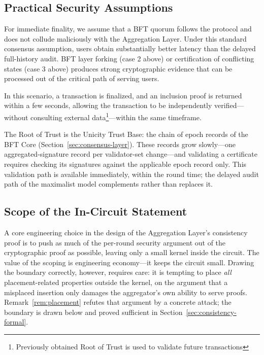 \documentclass[twocolumn]{article}
\begin{document}
\subsection{Practical Security Assumptions}
\label{sec:practical}

For immediate finality, we assume that a BFT quorum follows the protocol and does not collude maliciously with the Aggregation Layer. Under this standard consensus assumption, users obtain substantially better latency than the delayed full-history audit. BFT layer forking (case 2 above) or certification of conflicting states (case 3 above) produces strong cryptographic evidence that can be processed out of the critical path of serving users.

In this scenario, a transaction is finalized, and an inclusion proof is returned within a few seconds, allowing the transaction to be independently verified—without consulting external data\footnote{Previously obtained Root of Trust is used to validate future transactions}—within the same timeframe.

The Root of Trust is the Unicity Trust Base: the chain of epoch records of the BFT Core (Section~\ref{sec:consensus-layer}). These records grow slowly---one aggregated-signature record per validator-set change---and validating a certificate requires checking its signatures against the applicable epoch record only. This validation path is available immediately, within the round time; the delayed audit path of the maximalist model complements rather than replaces it.


\subsection{Scope of the In-Circuit Statement}
\label{sec:scope}

A core engineering choice in the design of the Aggregation Layer's consistency proof is to push as much of the per-round security argument out of the cryptographic proof as possible, leaving only a small kernel inside the circuit. The value of the scoping is engineering economy---it keeps the circuit small. Drawing the boundary correctly, however, requires care: it is tempting to place \emph{all} placement-related properties outside the kernel, on the argument that a misplaced insertion only damages the aggregator's own ability to serve proofs. Remark~\ref{rem:placement} refutes that argument by a concrete attack; the boundary is drawn below and proved sufficient in Section~\ref{sec:consistency-formal}.
\end{document}
